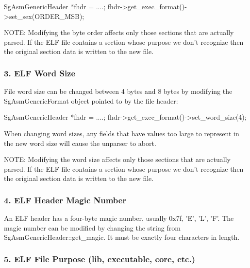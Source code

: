       SgAsmGenericHeader *fhdr = ....;
      fhdr->get\_exec\_format()->set\_sex(ORDER\_MSB);

   NOTE: Modifying the byte order affects only those sections that are actually parsed. If the ELF file contains a section
   whose purpose we don't recognize then the original section data is written to the new file.


\subsubsection{3. ELF Word Size}

   File word size can be changed between 4 bytes and 8 bytes by modifying the SgAsmGenericFormat object pointed to by the file
   header:

      SgAsmGenericHeader *fhdr = ....;
      fhdr->get\_exec\_format()->set\_word\_size(4);

   When changing word sizes, any fields that have values too large to represent in the new word size will cause the unparser
   to abort.

   NOTE: Modifying the word size affects only those sections that are actually parsed. If the ELF file contains a section whose
   purpose we don't recognize then the original section data is written to the new file.


\subsubsection{4. ELF Header Magic Number}

   An ELF header has a four-byte magic number, usually 0x7f, 'E', 'L', 'F'.  The magic number can be modified by changing the
   string from SgAsmGenericHeader::get\_magic.  It must be exactly four characters in length.

\subsubsection{5. ELF File Purpose (lib, executable, core, etc.)}

